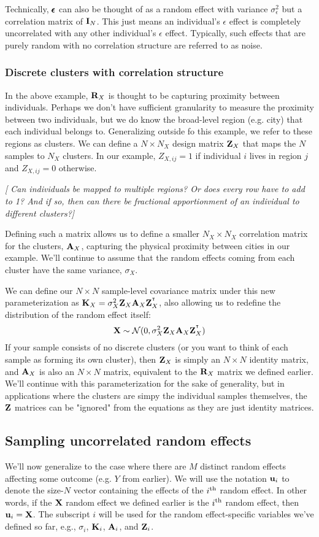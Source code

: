 \documentclass[12pt]{article}
\begin{document}
Technically, $\pmb{\epsilon}$ can also be thought of as a random effect with variance $\sigma_\epsilon^2$ but a correlation matrix of $\mathbf{I}_N$.
This just means an individual's $\epsilon$ effect is completely uncorrelated with any other individual's  $\epsilon$ effect.
Typically, such effects that are purely random with no correlation structure are referred to as noise.

\subsubsection{Discrete clusters with correlation structure}
In the above example, $\mathbf{R}_X$ is thought to be capturing proximity between individuals.
Perhaps we don't have sufficient granularity to measure the proximity between two individuals, but we do know the broad-level region (e.g. city) that each individual belongs to.
Generalizing outside fo this example, we refer to these regions as clusters.
We can define a $N \times N_X$ design matrix $\mathbf{Z}_X$ that maps the $N$ samples to $N_X$ clusters. In our example,
$Z_{X,ij} = 1$ if individual $i$ lives in region $j$ and $ Z_{X,ij} = 0$ otherwise.

\emph{[ Can individuals be mapped to multiple regions? Or does every row have to add to 1? And if so, then can there be fractional apportionment of an individual to different clusters?] }

Defining such a matrix allows us to define a smaller $N_X \times N_X$ correlation matrix for the clusters, $\mathbf{A}_X$, capturing the physical proximity between cities in our example.
We'll continue to assume that the random effects coming from each cluster have the same variance, $\sigma_X$.

We can define our $N \times N$ sample-level covariance matrix under this new parameterization as $\mathbf{K}_X = \sigma_X^2 \mathbf{Z}_X \mathbf{A}_X \mathbf{Z}_X^{^\intercal}$, also allowing us to redefine the distribution of the random effect itself:
$$ \mathbf{X} \sim \mathcal{N} (0, \sigma_X^2 \mathbf{Z}_X \mathbf{A}_X \mathbf{Z}_X^{^\intercal} ) $$
If your sample consists of no discrete clusters (or you want to think of each sample as forming its own cluster), then $\mathbf{Z}_X$ is simply an $N \times N$ identity matrix, and $\mathbf{A}_X$ is also an $N \times N$ matrix, equivalent to the $\mathbf{R}_X$ matrix we defined earlier.
We'll continue with this parameterization for the sake of generality, but in applications where the clusters are simpy the individual samples themselves, the $\mathbf{Z}$ matrices can be "ignored" from the equations as they are just identity matrices.

\subsection{Sampling uncorrelated random effects}
We'll now generalize to the case where there are $M$ distinct random effects affecting some outcome (e.g. $Y$ from earlier).
We will use the notation $\mathbf{u}_i$ to denote the size-$N$ vector containing the effects of the $i\textsuperscript{th}$ random effect.
In other words, if the $\mathbf{X}$ random effect we defined earlier is the $i\textsuperscript{th}$ random effect, then $\mathbf{u}_i = \mathbf{X}$. 
The subscript $i$ will be used for the random effect-specific variables we've defined so far, e.g., $\sigma_i$, $\mathbf{K}_i$, $\mathbf{A}_i$, and $\mathbf{Z}_i$.
\end{document}
